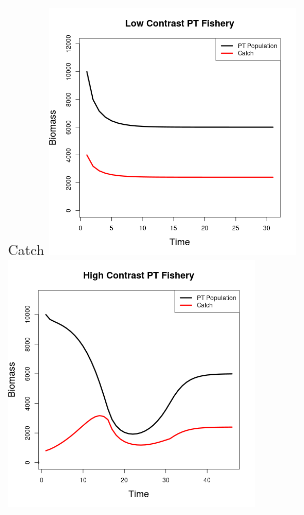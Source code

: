 \documentclass[ xcolor = pdftex, dvipsnames, table ]{beamer}
\begin{document}

%
\begin{frame}{Catch}
\includegraphics[width=0.49\textwidth]{../../.././nick/gpBias/bioCatchFlatNoQX2Z0.6.png}
\includegraphics[width=0.49\textwidth]{../../.././nick/gpBias/bioCatchExpT45X2Z0.6.png}
\end{frame}
\end{document}
